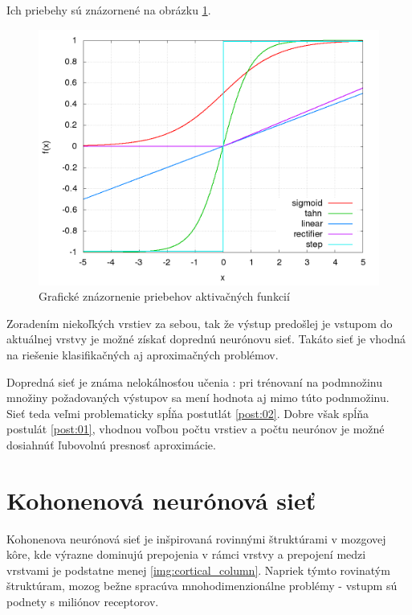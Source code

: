 Ich priebehy sú znázornené na obrázku \ref{img:nn_functions}.

\begin{figure}[!htb]
\center
\includegraphics[scale=.4]{../pictures/nn_functions.png}
\caption{Grafické znázornenie priebehov aktivačných funkcií}
\label{img:nn_functions}
\end{figure}

Zoradením niekoľkých vrstiev za sebou, tak že výstup predošlej je vstupom do aktuálnej
vrstvy je možné získať doprednú neurónovu sieť. Takáto sieť je vhodná na riešenie klasifikačných
aj aproximačných problémov.

Dopredná sieť je známa nelokálnosťou učenia : pri trénovaní na podmnožinu množiny
požadovaných výstupov sa mení hodnota aj mimo túto podnmožinu. Sieť teda veľmi
problematicky spĺňa postutlát \ref{post:02}. Dobre však spĺňa postulát \ref{post:01},
vhodnou voľbou počtu vrstiev a počtu neurónov je možné dosiahnúť ľubovolnú
presnosť aproximácie.

\section{Kohonenová neurónová sieť}

Kohonenova neurónová sieť je inšpirovaná rovinnými štruktúrami v mozgovej kôre,
kde výrazne dominujú prepojenia v rámci vrstvy a prepojení medzi vrstvami je
podstatne menej \ref{img:cortical_column}. Napriek týmto rovinatým štruktúram,
mozog bežne spracúva mnohodimenzionálne problémy - vstupm sú podnety s miliónov
receptorov.

